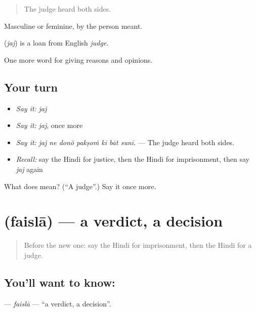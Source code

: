 \begin{quote}
The judge heard both sides.
\end{quote}

Masculine or feminine, by the person meant.

\begin{cousinweb}
\textbf{} (\emph{jaj}) is a loan from English \emph{judge}.
\end{cousinweb}

\begin{grammarlens}[title={What you've built}]
One more word for giving reasons and opinions.
\end{grammarlens}

\subsection*{Your turn}
\begin{itemize}
\raggedright
  \item \emph{Say it:} \emph{jaj}
  \item \emph{Say it:} \emph{jaj}, once more
  \item \emph{Say it:} \emph{jaj ne donõ pakṣoṁ kī bāt sunī.} — The judge heard both sides.
  \item \emph{Recall:} say the Hindi for justice, then the Hindi for imprisonment, then say \emph{jaj} again
\end{itemize}

\begin{tcolorbox}[breakable,colback=teal!4,colframe=teal!35!black,title={Before you move on}]
What does  mean? (\textquotedblleft{}A judge\textquotedblright{}.) Say it once more.
\end{tcolorbox}
\section[\texorpdfstring{\hi{फ़ैसला} (faislā)}{फ़ैसला (faislā)}]{ (faislā) — a verdict, a decision}

\label{lesson:HI-C352-faisla}



\begin{quote}
Before the new one: say the Hindi for imprisonment, then the Hindi for a judge.
\end{quote}

\subsection*{You'll want to know: }
\textbf{} — \emph{faislā} — \textquotedblleft{}a verdict, a decision\textquotedblright{}.

